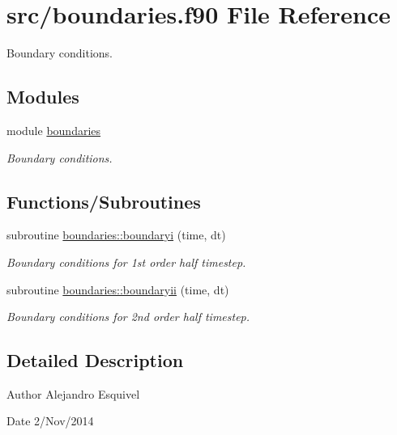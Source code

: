 \hypertarget{boundaries_8f90}{}\section{src/boundaries.f90 File Reference}
\label{boundaries_8f90}


Boundary conditions.  


\subsection*{Modules}
\begin{DoxyCompactItemize}
\item 
module \hyperlink{namespaceboundaries}{boundaries}
\begin{DoxyCompactList}\small\item\em Boundary conditions. \end{DoxyCompactList}\end{DoxyCompactItemize}
\subsection*{Functions/\+Subroutines}
\begin{DoxyCompactItemize}
\item 
subroutine \hyperlink{namespaceboundaries_a3742debeb694e374aed0d5b1e6970b8a}{boundaries\+::boundaryi} (time, dt)
\begin{DoxyCompactList}\small\item\em Boundary conditions for 1st order half timestep. \end{DoxyCompactList}\item 
subroutine \hyperlink{namespaceboundaries_ae74a7f6b33366d1adac94ac3bc438104}{boundaries\+::boundaryii} (time, dt)
\begin{DoxyCompactList}\small\item\em Boundary conditions for 2nd order half timestep. \end{DoxyCompactList}\end{DoxyCompactItemize}


\subsection{Detailed Description}
\begin{DoxyAuthor}{Author}
Alejandro Esquivel 
\end{DoxyAuthor}
\begin{DoxyDate}{Date}
2/\+Nov/2014 
\end{DoxyDate}
